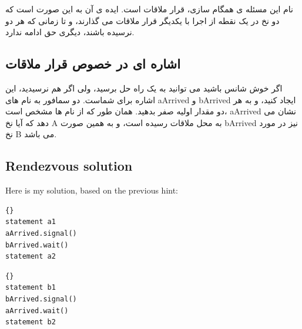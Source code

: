\documentclass{book}
\newcommand{\clearemptydoublepage}{\newpage\cleardoublepage}
\begin{document}
نام این مسئله ی همگام سازی، قرار ملاقات است. ایده ی آن به این صورت است که دو نخ در یک نقطه از اجرا با یکدیگر قرار ملاقات می گذارند، و تا زمانی که هر دو نرسیده باشند، دیگری حق ادامه ندارد.


\clearemptydoublepage
\subsection{اشاره ای در خصوص قرار ملاقات}



اگر خوش شانس باشید می توانید به یک راه حل برسید، ولی اگر هم نرسیدید، این اشاره برای شماست. دو سمافور به نام های aArrived و bArrived ایجاد کنید، و به هر دو مقدار اولیه صفر بدهید. همان طور که از نام ها مشخص است، aArrived نشان می دهد که آیا نخ A به محل ملاقات رسیده است، و به همین صورت bArrived نیز در مورد نخ B می باشد.

\clearemptydoublepage
\subsection{Rendezvous solution}

Here is my solution, based on the previous hint:

\begin{minipage}[t]{2in}
\begin{lstlisting}[title={Thread A}]{}
statement a1
aArrived.signal()
bArrived.wait()
statement a2
\end{lstlisting}
\end{minipage}
\hfill
\begin{minipage}[t]{2in}
\begin{lstlisting}[title={Thread B}]{}
statement b1
bArrived.signal()
aArrived.wait()
statement b2
\end{lstlisting}
\end{minipage}
\end{document}
